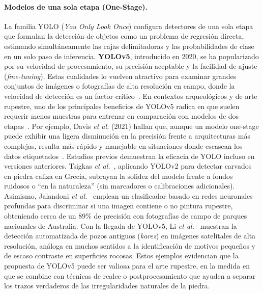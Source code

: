 \paragraph{Modelos de una sola etapa (One-Stage).}
La familia YOLO (\textit{You Only Look Once}) configura detectores de una sola etapa que formulan la detección de objetos como un problema de regresión directa, estimando simultáneamente las cajas delimitadoras y las probabilidades de clase en un solo paso de inferencia.
\textbf{YOLOv5}, introducido en 2020, se ha popularizado por su velocidad de procesamiento, su precisión aceptable y la facilidad de ajuste (\textit{fine-tuning}).
Estas cualidades lo vuelven atractivo para examinar grandes conjuntos de imágenes o fotografías de alta resolución en campo, donde la velocidad de detección es un factor crítico~\cite{li2022}.
En contextos arqueológicos y de arte rupestre, uno de los principales beneficios de YOLOv5 radica en que suelen requerir menos muestras para entrenar en comparación con modelos de dos etapas~\cite{suhaimi2023}.
Por ejemplo, Davis \textit{et al.} (2021) hallan que, aunque un modelo one-stage puede exhibir una ligera disminución en la precisión frente a arquitecturas más complejas, resulta más rápido y manejable en situaciones donde escasean los datos etiquetados~\cite{davis2021}.
Estudios previos demuestran la eficacia de YOLO incluso en versiones anteriores.
Tsigkas \textit{et al.}~\cite{tsigkas2020}, aplicando YOLOv2 para detectar carvados en piedra caliza en Grecia, subrayan la solidez del modelo frente a fondos ruidosos o “en la naturaleza” (sin marcadores o calibraciones adicionales).
Asimismo, Jalandoni \textit{et al.}~\cite{jalandoni2022} emplean un clasificador basado en redes neuronales profundas para discriminar si una imagen contiene o no pintura rupestre, obteniendo cerca de un 89\% de precisión con fotografías de campo de parques nacionales de Australia.
Con la llegada de YOLOv5, Li \textit{et al.}~\cite{li2022} muestran la detección automatizada de pozos antiguos (\textit{karez}) en imágenes satelitales de alta resolución, análoga en muchos sentidos a la identificación de motivos pequeños y de escaso contraste en superficies rocosas.
Estos ejemplos evidencian que la propuesta de YOLOv5 puede ser valiosa para el arte rupestre, en la medida en que se combine con técnicas de realce o postprocesamiento que ayuden a separar los trazos verdaderos de las irregularidades naturales de la piedra.

